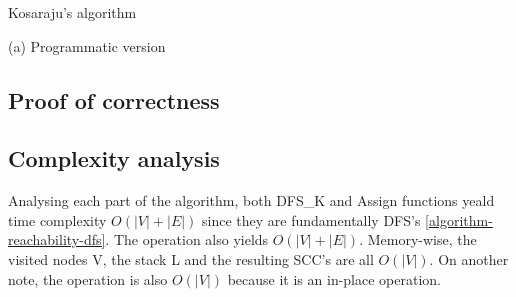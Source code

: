 \begin{center}
    \begin{algorithm}
        \caption{Kosaraju's algorithm}
        \label{alg-kosaraju}
        \begin{minipage}[t]{0.49\linewidth}
            (a) Programmatic version
            \begin{algorithmic}[1]
                     {\Return{}}
                    \EndIf
                    \EndFor
                \EndFunction


                     {\Return{}}
                    \EndIf
                    \For{$v : Adj[u]]$}
                    \EndFor
                \EndFunction

                 {}
                \EndFor
                    \State {}
                \EndWhile
                \State {}
                \EndFunction
            \end{algorithmic}
        \end{minipage}
    \end{algorithm}
\end{center}
\subsection{Proof of correctness}

\subsection{Complexity analysis}
Analysing each part of the algorithm, both DFS\_K and Assign functions yeald time complexity $O(|V|+|E|)$ since they are fundamentally DFS's \ref{algorithm-reachability-dfs}. The  operation also yields $O(|V|+|E|)$.
Memory-wise, the visited nodes V, the stack L and the resulting SCC's are all $O(|V|)$. On another note, the  operation is also $O(|V|)$ because it is an in-place operation.




